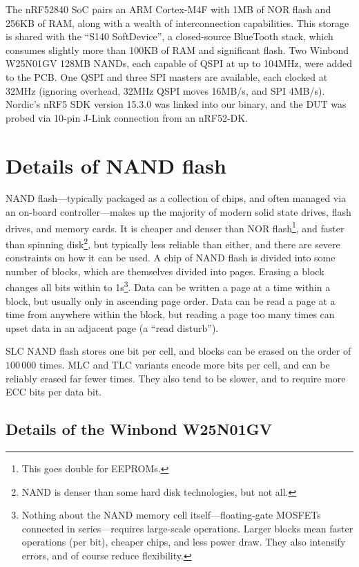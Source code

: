 \documentclass[letterpaper,10pt]{article}
\begin{document}
The nRF52840\parencite{nrf52840} SoC pairs an ARM Cortex-M4F with 1MB of
NOR flash and 256KB of RAM, along with a wealth of interconnection
capabilities. This storage is shared with the ``S140
SoftDevice''\parencite{s140}, a closed-source BlueTooth stack, which consumes
slightly more than 100KB of RAM and significant flash.
Two Winbond W25N01GV\parencite{winbond}
128MB NANDs, each capable of QSPI at up to 104MHz, were added to the PCB.
One QSPI and three SPI masters are available, each clocked at 32MHz (ignoring
overhead, 32MHz QSPI moves 16MB/s, and SPI 4MB/s). Nordic's nRF5 SDK\parencite{nrf52sdk}
version 15.3.0 was linked into our binary, and the DUT was probed via 10-pin
J-Link\parencite{segger} connection from an nRF52-DK\parencite{nrf52dk}.

\section{Details of NAND flash}

NAND flash---typically packaged as a collection of chips, and often managed via
an on-board controller---makes up the majority of modern solid state drives,
flash drives, and memory cards. It is cheaper and denser than NOR flash\footnote{This goes double for EEPROMs.},
and faster than spinning disk\footnote{NAND is denser than some hard disk
technologies, but not all.}, but typically less reliable than either, and there
are severe constraints on how it can be used. A chip of NAND flash is divided
into some number of blocks, which are themselves divided into pages. Erasing
a block changes all bits within to 1s\footnote{Nothing about the NAND memory
cell itself---floating-gate MOSFETs connected in series---requires large-scale
operations. Larger blocks mean faster operations (per bit), cheaper chips, and
less power draw. They also intensify errors, and of course reduce flexibility.}.
Data can be written a page at a time within a block, but usually only in
ascending page order. Data can be read a page at a time from anywhere within
the block, but reading a page too many times can upset data in an adjacent
page (a ``read disturb'').

SLC NAND flash stores one bit per
cell, and blocks can be erased on the order of $100\,000$ times. MLC and TLC
variants encode more bits per cell, and can be reliably erased far fewer times. They
also tend to be slower, and to require more ECC bits per data bit.

\subsection{Details of the Winbond W25N01GV}
\end{document}
